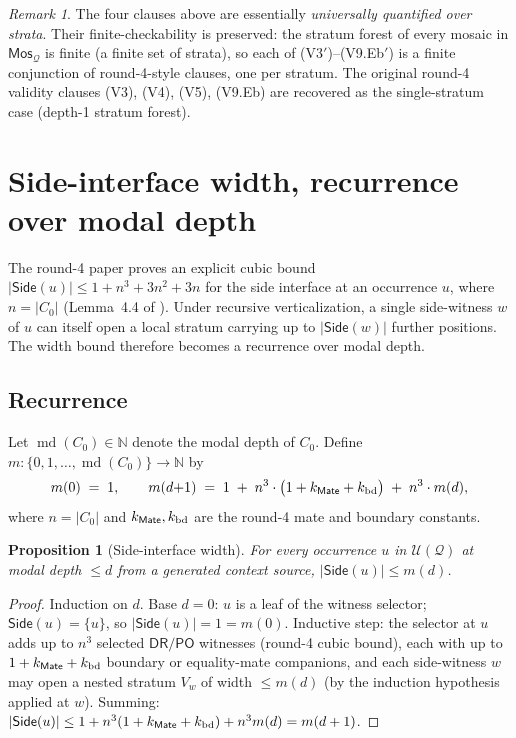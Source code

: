 \documentclass[11pt]{article}
\newtheorem{proposition}[theorem]{Proposition}
\theoremstyle{definition}
\theoremstyle{remark}
\newtheorem{remark}[theorem]{Remark}
\newcommand{\DR}{\mathsf{DR}}
\newcommand{\PO}{\mathsf{PO}}
\newcommand{\Mos}{\mathsf{Mos}}
\newcommand{\Mate}{\mathsf{Mate}}
\newcommand{\Side}{\mathsf{Side}}
\newcommand{\Q}{\mathcal{Q}}
\newcommand{\U}{\mathcal{U}}
\newcommand{\md}{\operatorname{md}}
\begin{document}
\medskip

\begin{remark}\label{rem:carry-over}
The four clauses above are essentially \emph{universally quantified
over strata}.  Their finite-checkability is preserved: the stratum
forest of every mosaic in $\Mos_\Q$ is finite (a finite set of
strata), so each of (V3$'$)--(V9.Eb$'$) is a finite conjunction of
round-4-style clauses, one per stratum.  The original round-4
validity clauses (V3), (V4), (V5), (V9.Eb) are recovered as the
single-stratum case (depth-1 stratum forest).
\end{remark}

\section{Side-interface width, recurrence over modal depth}
\label{sec:side-bound}

The round-4 paper proves an explicit cubic bound
$|\Side(u)|\leq 1+n^3+3n^2+3n$ for the side interface at an
occurrence $u$, where $n=|C_0|$ (Lemma~4.4 of
\cite{GPT55Repaired}).  Under recursive verticalization, a single
side-witness $w$ of $u$ can itself open a local stratum carrying up
to $|\Side(w)|$ further positions.  The width bound therefore becomes
a recurrence over modal depth.

\subsection{Recurrence}

Let $\md(C_0)\in\mathbb N$ denote the modal depth of $C_0$.  Define
$m:\{0,1,\dots,\md(C_0)\}\to\mathbb N$ by
\[
  m(0)\;=\;1,\qquad
  m(d{+}1)\;=\;1\;+\;n^3\cdot\bigl(1+k_\Mate+k_{\rm bd}\bigr)\;+\;n^3\cdot m(d),
\]
where $n=|C_0|$ and $k_\Mate,k_{\rm bd}$ are the round-4 mate and
boundary constants.

\begin{proposition}[Side-interface width]\label{prop:side-width}
For every occurrence $u$ in $\U(\Q)$ at modal depth $\leq d$ from a
generated context source, $|\Side(u)|\leq m(d)$.
\end{proposition}

\begin{proof}
Induction on $d$.  Base $d=0$: $u$ is a leaf of the witness selector;
$\Side(u)=\{u\}$, so $|\Side(u)|=1=m(0)$.  Inductive step: the
selector at $u$ adds up to $n^3$ selected $\DR/\PO$ witnesses
(round-4 cubic bound), each with up to $1+k_\Mate+k_{\rm bd}$
boundary or equality-mate companions, and each side-witness $w$ may
open a nested stratum $V_w$ of width $\leq m(d)$ (by the induction
hypothesis applied at $w$).  Summing: $|\Side(u)|\leq 1 +
n^3(1+k_\Mate+k_{\rm bd}) + n^3 m(d) = m(d+1)$.
\end{proof}
\end{document}
